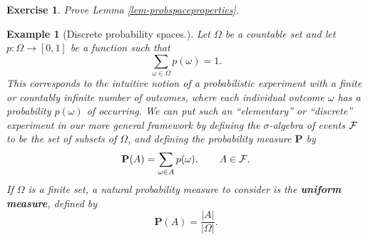 \documentclass[12pt]{article}
\newtheorem{exercise}[thm]{Exercise}
\newcommand{\prob}{\mathbf{P}}
\theoremstyle{example}
\newtheorem{example}[thm]{Example}
\begin{document}
\begin{exercise} Prove Lemma \ref{lem-probspaceproperties}.
\end{exercise}


\begin{example}[Discrete probability spaces.] Let $\Omega$ be a countable set and let $p:\Omega\to[0,1]$ be a function such that
$$ \sum_{\omega \in \Omega} p(\omega) = 1. $$
This corresponds to the intuitive notion of a probabilistic experiment with a finite or countably infinite number of outcomes, where each individual outcome $\omega$ has a probability $p(\omega)$ of occurring. We can put such an ``elementary'' or ``discrete'' experiment in our more general framework by defining the $\sigma$-algebra of events ${\cal F}$ to be the set of subsets of $\Omega$, and defining the probability measure $\prob$ by
$$ \prob(A) = \sum_{\omega \in A} p(\omega), \qquad A\in {\cal F}. $$
If $\Omega$ is a finite set, a natural probability measure to consider is the \textbf{uniform measure}, defined by
$$ \prob(A) = \frac{|A|}{|\Omega|}. $$
\end{example}
\end{document}
